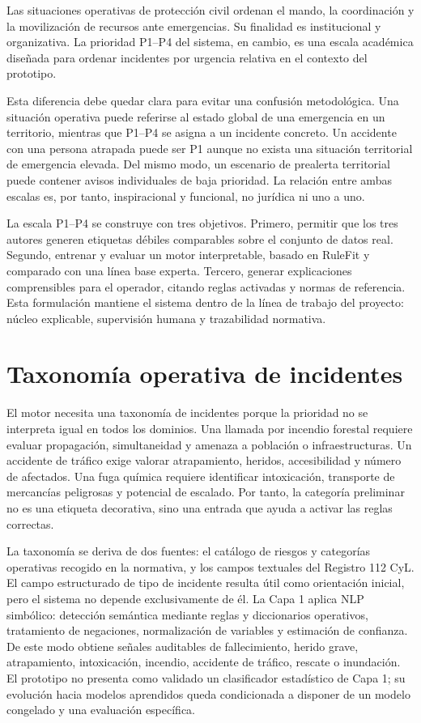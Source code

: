 Las situaciones operativas de protección civil ordenan el mando, la coordinación y la movilización de recursos ante emergencias. Su finalidad es institucional y organizativa. La prioridad P1--P4 del sistema, en cambio, es una escala académica diseñada para ordenar incidentes por urgencia relativa en el contexto del prototipo.

Esta diferencia debe quedar clara para evitar una confusión metodológica. Una situación operativa puede referirse al estado global de una emergencia en un territorio, mientras que P1--P4 se asigna a un incidente concreto. Un accidente con una persona atrapada puede ser P1 aunque no exista una situación territorial de emergencia elevada. Del mismo modo, un escenario de prealerta territorial puede contener avisos individuales de baja prioridad. La relación entre ambas escalas es, por tanto, inspiracional y funcional, no jurídica ni uno a uno.

La escala P1--P4 se construye con tres objetivos. Primero, permitir que los tres autores generen etiquetas débiles comparables sobre el conjunto de datos real. Segundo, entrenar y evaluar un motor interpretable, basado en RuleFit y comparado con una línea base experta. Tercero, generar explicaciones comprensibles para el operador, citando reglas activadas y normas de referencia. Esta formulación mantiene el sistema dentro de la línea de trabajo del proyecto: núcleo explicable, supervisión humana y trazabilidad normativa.

\section{Taxonomía operativa de incidentes}

El motor necesita una taxonomía de incidentes porque la prioridad no se interpreta igual en todos los dominios. Una llamada por incendio forestal requiere evaluar propagación, simultaneidad y amenaza a población o infraestructuras. Un accidente de tráfico exige valorar atrapamiento, heridos, accesibilidad y número de afectados. Una fuga química requiere identificar intoxicación, transporte de mercancías peligrosas y potencial de escalado. Por tanto, la categoría preliminar no es una etiqueta decorativa, sino una entrada que ayuda a activar las reglas correctas.

La taxonomía se deriva de dos fuentes: el catálogo de riesgos y categorías operativas recogido en la normativa, y los campos textuales del Registro 112 CyL. El campo estructurado de tipo de incidente resulta útil como orientación inicial, pero el sistema no depende exclusivamente de él. La Capa 1 aplica NLP simbólico: detección semántica mediante reglas y diccionarios operativos, tratamiento de negaciones, normalización de variables y estimación de confianza. De este modo obtiene señales auditables de fallecimiento, herido grave, atrapamiento, intoxicación, incendio, accidente de tráfico, rescate o inundación. El prototipo no presenta como validado un clasificador estadístico de Capa 1; su evolución hacia modelos aprendidos queda condicionada a disponer de un modelo congelado y una evaluación específica.

